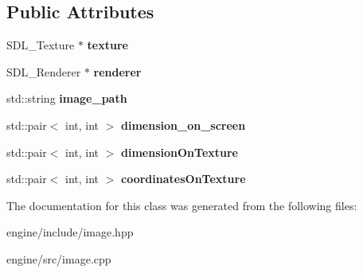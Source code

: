 \subsection*{Public Attributes}
\begin{DoxyCompactItemize}
\item 
S\+D\+L\+\_\+\+Texture $\ast$ {\bfseries texture}\hypertarget{classengine_1_1_image_a1aba43ce4fe48d3c18e4db97543c1077}{}\label{classengine_1_1_image_a1aba43ce4fe48d3c18e4db97543c1077}

\item 
S\+D\+L\+\_\+\+Renderer $\ast$ {\bfseries renderer}\hypertarget{classengine_1_1_image_a5ec39840fc23236d16dcdef43b87fc91}{}\label{classengine_1_1_image_a5ec39840fc23236d16dcdef43b87fc91}

\item 
std\+::string {\bfseries image\+\_\+path}\hypertarget{classengine_1_1_image_a57960b0ab1636eacff1a5b64d7402b37}{}\label{classengine_1_1_image_a57960b0ab1636eacff1a5b64d7402b37}

\item 
std\+::pair$<$ int, int $>$ {\bfseries dimension\+\_\+on\+\_\+screen}\hypertarget{classengine_1_1_image_abbbfdb4ce895511ce54105078fb39ebb}{}\label{classengine_1_1_image_abbbfdb4ce895511ce54105078fb39ebb}

\item 
std\+::pair$<$ int, int $>$ {\bfseries dimension\+On\+Texture}\hypertarget{classengine_1_1_image_aae242af0f586f7c31ffe38657bd0506c}{}\label{classengine_1_1_image_aae242af0f586f7c31ffe38657bd0506c}

\item 
std\+::pair$<$ int, int $>$ {\bfseries coordinates\+On\+Texture}\hypertarget{classengine_1_1_image_ab050b1278f3e32a44ceffe9365aa867b}{}\label{classengine_1_1_image_ab050b1278f3e32a44ceffe9365aa867b}

\end{DoxyCompactItemize}


The documentation for this class was generated from the following files\+:\begin{DoxyCompactItemize}
\item 
engine/include/image.\+hpp\item 
engine/src/image.\+cpp\end{DoxyCompactItemize}
